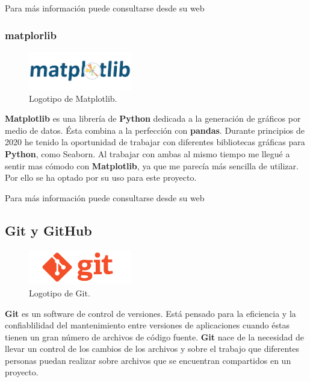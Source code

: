 Para más información puede consultarse desde su web \cite{pandas}

\subsubsection{matplorlib}

\begin{figure}[H]
	\centering
	\includegraphics[width=0.4\textwidth]{img/matplotlib-icon}
	\caption{Logotipo de Matplotlib.}
\end{figure}

\textbf{Matplotlib} es una librería de \textbf{Python} dedicada a la generación de gráficos por medio de datos. Ésta combina a la perfección con \textbf{pandas}. Durante principios de 2020 he tenido la oportunidad de trabajar con diferentes bibliotecas gráficas para \textbf{Python}, como Seaborn. Al trabajar con ambas al mismo tiempo me llegué a sentir mas cómodo con \textbf{Matplotlib}, ya que me parecía más sencilla de utilizar. Por ello se ha optado por su uso para este proyecto.

Para más información puede consultarse desde su web \cite{matplotlib}

\subsection{Git y GitHub}

\begin{figure}[H]
	\centering
	\includegraphics[width=0.4\textwidth]{img/git-icon}
	\caption{Logotipo de Git.}
\end{figure}

\textbf{Git} es un software de control de versiones. Está pensado para la eficiencia y la confiablilidad del mantenimiento entre versiones de aplicaciones cuando éstas tienen un gran número de archivos de código fuente. \textbf{Git} nace de la necesidad de llevar un control de los cambios de los archivos y sobre el trabajo que diferentes personas puedan realizar sobre archivos que se encuentran compartidos en un proyecto.

